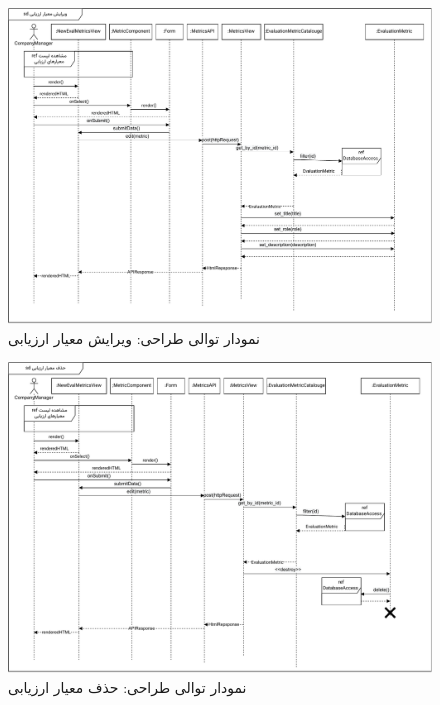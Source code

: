 \eject \pdfpagewidth=12in \pdfpageheight=11in

\begin{figure}[ht!]
	\centering
	\includegraphics[scale=0.8]{figs/design-sequence/3-28.pdf}
	\caption{نمودار توالی طراحی: ویرایش معیار ارزیابی}
\end{figure}
\FloatBarrier
\newpage

\eject \pdfpagewidth=12in \pdfpageheight=11in
\begin{figure}[ht!]
	\centering
	\includegraphics[scale=0.8]{figs/design-sequence/3-29.pdf}
	\caption{نمودار توالی طراحی: حذف معیار ارزیابی}
\end{figure}
\FloatBarrier
\newpage

\eject \pdfpagewidth=10in \pdfpageheight=9in

